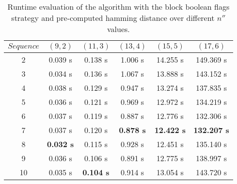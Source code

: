 \begin{table}[h] %
	\renewcommand{\arraystretch}{1.3}
	\label{tbl:nprime-prime-start-value}
	\centering
	\begin{tabular}{|c|c|c|c|c|c|}
		\hline 
		\bfseries\boldmath $Sequence$ & 
		\bfseries\boldmath $(9,2)$ & 
		\bfseries\boldmath $(11,3)$ & 
		\bfseries\boldmath $(13,4)$ & 
		\bfseries\boldmath $(15,5)$ & 
		\bfseries\boldmath $(17,6)$ \\
		\hline
			2	& 0.039	s & 0.138 s & 1.006	s & 14.255 s &	149.369 s\\
			3	& 0.034	s & 0.136 s & 1.067	s & 13.888 s &	143.152 s\\
			4	& 0.038	s & 0.129 s & 0.947	s & 13.274 s &	137.835 s\\
			5	& 0.036	s & 0.121 s & 0.969	s & 12.972 s &	134.219 s\\
			6	& 0.037	s & 0.119 s & 0.887	s & 12.776 s &	132.306 s\\
			7	& 0.037	s & 0.120 s & \textbf{0.878	s} & \textbf{12.422 s} &	\textbf{132.207 s}\\
			8	& \textbf{0.032	s} & 0.115 s & 0.928	s & 12.451 s &	135.140 s\\
			9	& 0.036	s & 0.106 s	& 0.891	s & 12.775 s &	138.997 s\\
			10	& 0.035	s & \textbf{0.104 s}	& 0.914 s &	13.054 s &	143.720 s\\
		\hline\end{tabular}
	\caption{Runtime evaluation of the algorithm with the block boolean flags strategy and pre-computed hamming distance over different $n''$ values.}
\end{table}